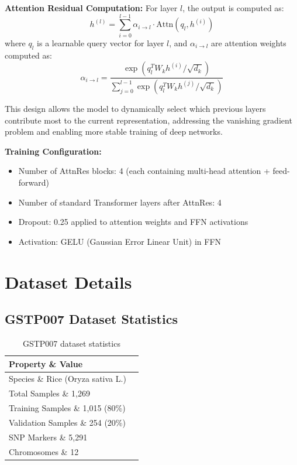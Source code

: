 \documentclass[11pt,a4paper]{article}
\begin{document}
\textbf{Attention Residual Computation:}
For layer $l$, the output is computed as:
\begin{equation}
    h^{(l)} = \sum_{i=0}^{l-1} \alpha_{i \rightarrow l} \cdot \text{Attn}(q_l, h^{(i)})
\end{equation}
where $q_l$ is a learnable query vector for layer $l$, and $\alpha_{i \rightarrow l}$ are attention weights computed as:
\begin{equation}
    \alpha_{i \rightarrow l} = \frac{\exp(q_l^T W_k h^{(i)} / \sqrt{d_k})}{\sum_{j=0}^{l-1} \exp(q_l^T W_k h^{(j)} / \sqrt{d_k})}
\end{equation}

This design allows the model to dynamically select which previous layers contribute most to the current representation, addressing the vanishing gradient problem and enabling more stable training of deep networks.

\textbf{Training Configuration:}
\begin{itemize}
    \item Number of AttnRes blocks: 4 (each containing multi-head attention + feed-forward)
    \item Number of standard Transformer layers after AttnRes: 4
    \item Dropout: 0.25 applied to attention weights and FFN activations
    \item Activation: GELU (Gaussian Error Linear Unit) in FFN
\end{itemize}

\section{Dataset Details}
\label{sec:dataset_details}

\subsection{GSTP007 Dataset Statistics}
\label{subsec:dataset_stats}

\begin{table}[H]
\centering
\caption{GSTP007 dataset statistics}
\label{tab:dataset_stats}
\begin{tabular}{ll}
\toprule
\textbf{Property} \& \textbf{Value} \\
\midrule
Species \& Rice (Oryza sativa L.) \\
Total Samples \& 1,269 \\
Training Samples \& 1,015 (80\%) \\
Validation Samples \& 254 (20\%) \\
SNP Markers \& 5,291 \\
Chromosomes \& 12 \\
\bottomrule
\end{tabular}
\end{table}
\end{document}
